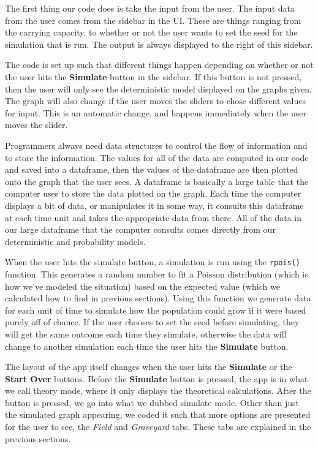 \documentclass[titlepage]{article}\usepackage[]{graphicx}\usepackage[]{color}
\begin{document}
The first thing our code does is take the input from the user. The input data from the user comes from the sidebar in the UI. These are things ranging from the carrying capacity, to whether or not the user wants to set the seed for the simulation that is run. The output is always displayed to the right of this sidebar. 

The code is set up such that different things happen depending on whether or not the user hits the \textbf{Simulate} button in the sidebar. If this button is not pressed, then the user will only see the deterministic model displayed on the graphs given. The graph will also change if the user moves the sliders to chose different values for input. This is an automatic change, and happens immediately when the user moves the slider. 

Programmers always need data structures to control the flow of information and to store the information. The values for all of the data are computed in our code and saved into a dataframe, then the values of the dataframe are then plotted onto the graph that the user sees. A dataframe is basically a large table that the computer uses to store the data plotted on the graph. Each time the computer displays a bit of data, or manipulates it in some way, it consults this dataframe at each time unit and takes the appropriate data from there. All of the data in our large dataframe that the computer consults comes directly from our deterministic and probability models.

When the user hits the simulate button, a simulation is run using the \texttt{rpois()} function. This generates a random number to fit a Poisson distribution (which is how we've modeled the situation) based on the expected value (which we calculated how to find in previous sections). Using this function we generate data for each unit of time to simulate how the population could grow if it were based purely off of chance. If the user chooses to set the seed before simulating, they will get the same outcome each time they simulate, otherwise the data will change to another simulation each time the user hits the \textbf{Simulate} button. 

The layout of the app itself changes when the user hits the \textbf{Simulate} or the \textbf{Start Over} buttons. Before the \textbf{Simulate} button is pressed, the app is in what we call theory mode, where it only displays the theoretical calculations. After the button is pressed, we go into what we dubbed simulate mode. Other than just the simulated graph appearing, we coded it such that more options are presented for the user to see, the \textit{Field} and \textit{Graveyard} tabs. These tabs are explained in the previous sections. 
\end{document}
